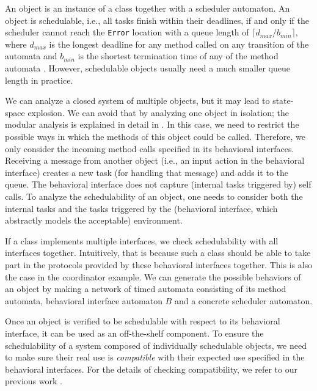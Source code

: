 \documentclass[copyright,creativecommons]{eptcs}
\theoremstyle{definition}
\begin{document}
\medskip
{}
An object  is an instance of a class together with a scheduler automaton.
An object is schedulable, i.e., all tasks finish within their deadlines,
 if and only if the scheduler cannot reach the \lstinline$Error$ location with a queue length of $\lceil d_{max} / b_{min} \rceil$,
where $d_{max}$ is the longest deadline for any method called on any transition of the automata and $b_{min}$ is the shortest termination time of any of the method automata \cite{Jaghoori09jlap}.
However, schedulable objects usually need a much smaller queue length in practice.

We can analyze a closed system of multiple objects, but it may lead to state-space explosion.
We can avoid that by analyzing one object in isolation; the modular analysis is explained in detail in \cite{Jaghoori09jlap}.
In this case, we need to restrict the possible ways in which  the methods of this object could be called.
Therefore, we only consider the incoming method calls specified in its behavioral interfaces.
Receiving a message from another object (i.e., an input action in the behavioral interface) creates a new task (for handling that message) and adds it to the queue.
The behavioral interface does not capture (internal tasks triggered by) self calls.
To analyze the schedulability of an object, one needs to consider both the internal tasks and the tasks triggered by the (behavioral interface, which abstractly models the acceptable) environment.


If a class implements multiple interfaces, we check schedulability with all interfaces together.
Intuitively, that is because such a class should be able to take part in the protocols provided by these behavioral interfaces together. This is also the case in the coordinator example.
We can generate the possible behaviors of an object by making a network of timed automata consisting of its method automata, behavioral interface automaton $B$ and a concrete scheduler automaton.



Once an object is verified to be schedulable with respect to its behavioral interface, it can be used as an off-the-shelf component. To ensure the schedulability of a system composed of individually schedulable objects, we need to make sure their real use is {\em compatible} with their expected use specified in the behavioral interfaces.
For the details of checking compatibility, we refer to our previous work \cite{Jaghoori09jlap,JaghouriDBC08RTSS}.
\end{document}
